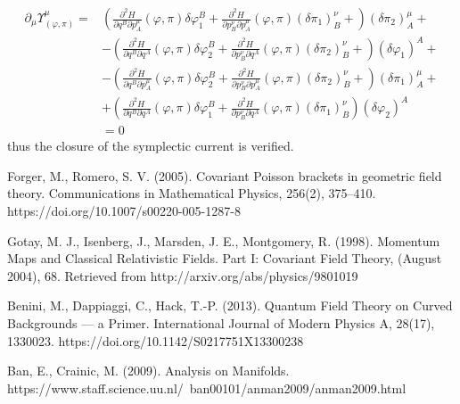 \documentclass[a4paper,12pt,fleqn]{scrartcl}  %
\begin{document}
\begin{align*}
	\partial_\mu \Upsilon_{(\varphi,\pi)}^\mu  =&	 
	\left(
		\frac{\partial^2 H}{\partial q^B \partial p^\mu_A} (\varphi,\pi) \delta \varphi_1^B +
		\frac{\partial^2 H}{\partial p^\nu_B \partial p^\mu_A} (\varphi,\pi) ( \delta \pi_1)^\nu_B +
	\right) ( \delta \pi_2)^\mu_A +\\
	&-\left(
		\frac{\partial^2 H}{\partial q^B \partial q^A} (\varphi,\pi) \delta \varphi_2^B +
		\frac{\partial^2 H}{\partial p^\nu_B \partial q^A} (\varphi,\pi) ( \delta \pi_2)^\nu_B +
	\right) ( \delta \varphi_1)^A +\\
	&-\left(
		\frac{\partial^2 H}{\partial q^B \partial p^\mu_A} (\varphi,\pi) \delta \varphi_2^B +
		\frac{\partial^2 H}{\partial p^\nu_B \partial p^\mu_A} (\varphi,\pi) ( \delta \pi_2)^\nu_B +
	\right) ( \delta \pi_1)^\mu_A +\\
	&+\left(
		\frac{\partial^2 H}{\partial q^B \partial q^A} (\varphi,\pi) \delta \varphi_1^B +
		\frac{\partial^2 H}{\partial p^\nu_B \partial q^A} (\varphi,\pi) ( \delta \pi_1)^\nu_B
	\right) ( \delta \varphi_2)^A \\
	&=0
\end{align*}
thus the closure of the symplectic current is verified.








\begin{thebibliography}{9}

Forger, M.,  Romero, S. V. (2005). Covariant Poisson brackets in geometric field theory. 
Communications in Mathematical Physics, 256(2), 375–410. 
https://doi.org/10.1007/s00220-005-1287-8

	Gotay, M. J., Isenberg, J., Marsden, J. E., Montgomery,	R. (1998). 
	Momentum Maps and Classical Relativistic
	Fields. Part I: Covariant Field Theory, (August 2004), 68. 
	Retrieved from http://arxiv.org/abs/physics/9801019

Benini, M., Dappiaggi, C., Hack, T.-P. (2013). Quantum Field Theory on Curved Backgrounds — a Primer. 
International Journal of Modern Physics A, 28(17), 1330023. 
https://doi.org/10.1142/S0217751X13300238



Ban, E., Crainic, M. (2009). Analysis on Manifolds.
https://www.staff.science.uu.nl/~ban00101/anman2009/anman2009.html

\end{thebibliography}
\end{document}
